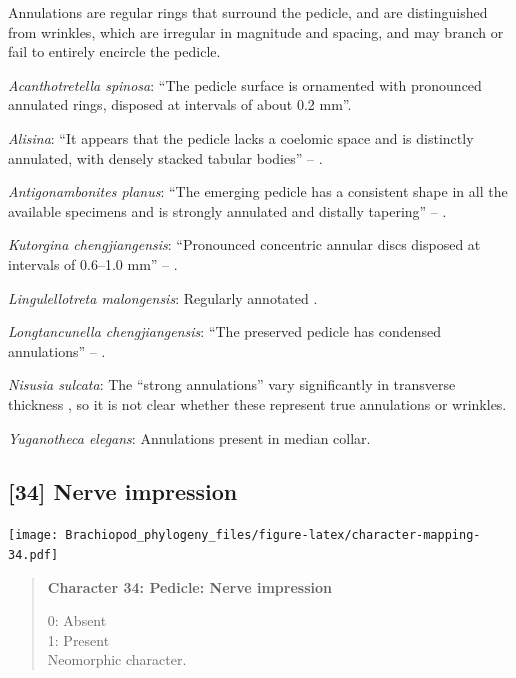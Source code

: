 \documentclass[openany]{book}
\begin{document}
Annulations are regular rings that surround the pedicle, and are
distinguished from wrinkles, which are irregular in magnitude and
spacing, and may branch or fail to entirely encircle the pedicle.

\hypertarget{Acanthotretella_spinosa-coding-33}{}
\emph{Acanthotretella spinosa}: ``The pedicle surface is ornamented with
pronounced annulated rings, disposed at intervals of about 0.2 mm''.

\hypertarget{Alisina-coding-33}{}
\emph{Alisina}: ``It appears that the pedicle lacks a coelomic space and
is distinctly annulated, with densely stacked tabular bodies'' --
\citet{Zhang2011Anobolellate}.

\hypertarget{Antigonambonites_planus-coding-33}{}
\emph{Antigonambonites planus}: ``The emerging pedicle has a consistent
shape in all the available specimens and is strongly annulated and
distally tapering'' -- \citet{Holmer2018Evolutionarysignificance}.

\hypertarget{Kutorgina_chengjiangensis-coding-33}{}
\emph{Kutorgina chengjiangensis}: ``Pronounced concentric annular discs
disposed at intervals of 0.6--1.0 mm'' --
\citet{Zhang2007Rhynchonelliformeanbrachiopods}.

\hypertarget{Lingulellotreta_malongensis-coding-33}{}
\emph{Lingulellotreta malongensis}: Regularly annotated \citep[see fig.
14.9 in][]{Hou2017Brachiopoda}.

\hypertarget{Longtancunella_chengjiangensis-coding-33}{}
\emph{Longtancunella chengjiangensis}: ``The preserved pedicle has
condensed annulations'' -- \citet{Zhang2011Theexceptionally}.

\hypertarget{Nisusia_sulcata-coding-33}{}
\emph{Nisusia sulcata}: The ``strong annulations'' vary significantly in
transverse thickness \citep{Holmer2018Evolutionarysignificance}, so it
is not clear whether these represent true annulations or wrinkles.

\hypertarget{Yuganotheca_elegans-coding-33}{}
\emph{Yuganotheca elegans}: Annulations present in median collar.

\subsection*{{[}34{]} Nerve impression}\label{nerve-impression}

\texttt{[image: Brachiopod\_phylogeny\_files/figure-latex/character-mapping-34.pdf]}

\begin{quote}
\textbf{Character 34: Pedicle: Nerve impression}

0: Absent\\
1: Present\\
Neomorphic character.
\end{quote}
\end{document}
